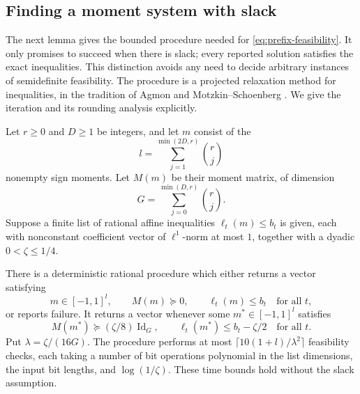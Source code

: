 \subsection{Finding a moment system with slack}

The next lemma gives the bounded procedure needed for
\eqref{eq:prefix-feasibility}.  It only promises to succeed when there
is slack; every reported solution satisfies the exact inequalities.
This distinction avoids any need to decide arbitrary instances of
semidefinite feasibility.
The procedure is a projected relaxation method for inequalities, in
the tradition of Agmon and Motzkin--Schoenberg
\cite{Agmon1954,MotzkinSchoenberg1954}.  We give the iteration and its
rounding analysis explicitly.

\begin{lemma}\label{lem:rational-feasibility}
Let \(r\ge0\) and \(D\ge1\) be integers, and let \(m\) consist of the
\[
 l=\sum_{j=1}^{\min(2D,r)}\binom rj
\]
nonempty sign moments.  Let \(M(m)\) be their moment matrix, of
dimension
\[
 G=\sum_{j=0}^{\min(D,r)}\binom rj.
\]
Suppose a finite list of rational affine inequalities
\(\ell_t(m)\le b_t\) is given, each with nonconstant coefficient vector
of \(\ell^1\)-norm at most \(1\), together with a dyadic
\(0<\zeta\le1/4\).

There is a deterministic rational procedure which either returns a
vector satisfying
\[
 m\in[-1,1]^l,\qquad M(m)\succeq0,\qquad \ell_t(m)\le b_t
 \quad\text{for all }t,
\]
or reports failure.  It returns a vector whenever some
\(m^*\in[-1,1]^l\) satisfies
\[
 M(m^*)\succeq(\zeta/8)\operatorname{Id}_G,\qquad
 \ell_t(m^*)\le b_t-\zeta/2\quad\text{for all }t.
\]
Put \(\lambda=\zeta/(16G)\).  The procedure performs at most
\(\lceil10(1+l)/\lambda^2\rceil\) feasibility checks, each taking a
number of bit operations polynomial in the list dimensions, the
input bit lengths, and \(\log(1/\zeta)\).  These time bounds hold
without the slack assumption.
\end{lemma}

